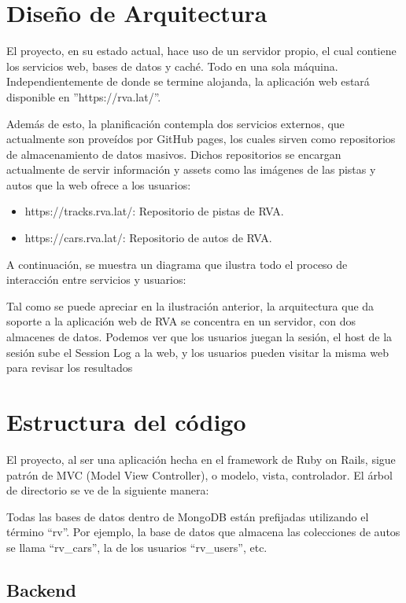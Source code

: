 \section{Diseño de Arquitectura}
El proyecto, en su estado actual, hace uso de un servidor propio, el cual contiene los servicios web, bases de datos y caché. Todo en una sola máquina. Independientemente de donde se termine alojanda, la aplicación web estará disponible en ''https://rva.lat/''.

Además de esto, la planificación contempla dos servicios externos, que actualmente son proveídos por GitHub pages, los cuales sirven como repositorios de almacenamiento de datos masivos. Dichos repositorios se encargan actualmente de servir información y assets como las imágenes de las pistas y autos que la web ofrece a los usuarios:

\begin{itemize}
	\item https://tracks.rva.lat/: Repositorio de pistas de RVA.
	\item https://cars.rva.lat/: Repositorio de autos de RVA.
\end{itemize}

A continuación, se muestra un diagrama que ilustra todo el proceso de interacción entre servicios y usuarios:

Tal como se puede apreciar en la ilustración anterior, la arquitectura que da soporte a la aplicación web de RVA se concentra en un servidor, con dos almacenes de datos. Podemos ver que los usuarios juegan la sesión, el host de la sesión sube el Session Log a la web, y los usuarios pueden visitar la misma web para revisar los resultados

\section{Estructura del código}
El proyecto, al ser una aplicación hecha en el framework de Ruby on Rails, sigue patrón de MVC (Model View Controller), o modelo, vista, controlador. El árbol de directorio se ve de la siguiente manera:


Todas las bases de datos dentro de MongoDB están prefijadas utilizando el término “rv”. Por ejemplo, la base de datos que almacena las colecciones de autos se llama “rv\_cars”, la de los usuarios “rv\_users”, etc.

\subsection{Backend}

